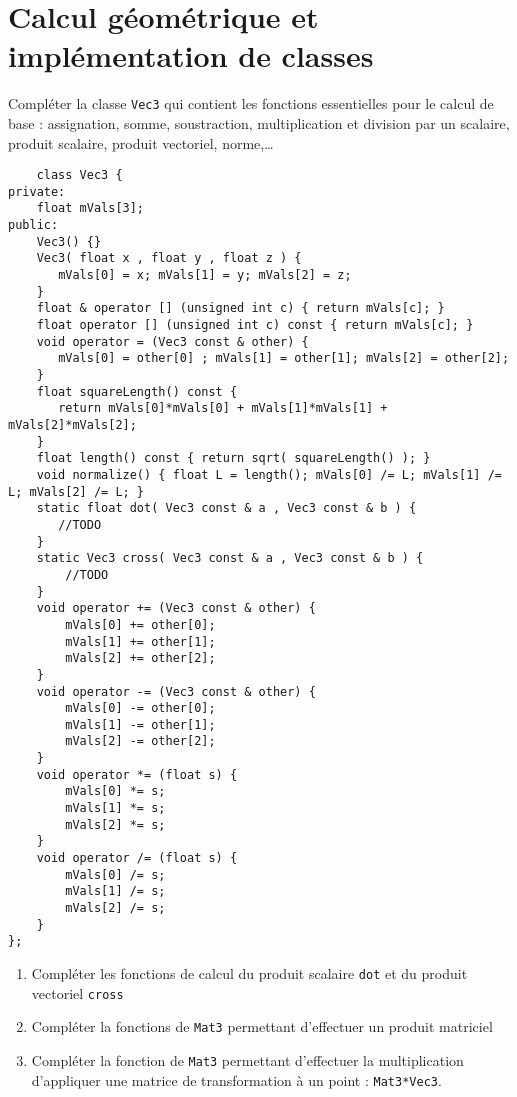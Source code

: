 \documentclass[a4paper,10pt]{tp_um}
\newcommand\code[1]{\texttt{#1}}
\begin{document}
\section{Calcul géométrique et implémentation de classes}

\label{sec_exo_Vec3}

Compléter la classe \code{Vec3} qui contient les fonctions essentielles pour le calcul de base : assignation, somme, soustraction, multiplication et division par un scalaire, produit scalaire, produit vectoriel, norme,\ldots

\begin{verbatim}
    class Vec3 {
private:
    float mVals[3];
public:
    Vec3() {}
    Vec3( float x , float y , float z ) {
       mVals[0] = x; mVals[1] = y; mVals[2] = z;
    }
    float & operator [] (unsigned int c) { return mVals[c]; }
    float operator [] (unsigned int c) const { return mVals[c]; }
    void operator = (Vec3 const & other) {
       mVals[0] = other[0] ; mVals[1] = other[1]; mVals[2] = other[2];
    }
    float squareLength() const {
       return mVals[0]*mVals[0] + mVals[1]*mVals[1] + mVals[2]*mVals[2];
    }
    float length() const { return sqrt( squareLength() ); }
    void normalize() { float L = length(); mVals[0] /= L; mVals[1] /= L; mVals[2] /= L; }
    static float dot( Vec3 const & a , Vec3 const & b ) {
       //TODO
    }
    static Vec3 cross( Vec3 const & a , Vec3 const & b ) {
        //TODO
    }
    void operator += (Vec3 const & other) {
        mVals[0] += other[0];
        mVals[1] += other[1];
        mVals[2] += other[2];
    }
    void operator -= (Vec3 const & other) {
        mVals[0] -= other[0];
        mVals[1] -= other[1];
        mVals[2] -= other[2];
    }
    void operator *= (float s) {
        mVals[0] *= s;
        mVals[1] *= s;
        mVals[2] *= s;
    }
    void operator /= (float s) {
        mVals[0] /= s;
        mVals[1] /= s;
        mVals[2] /= s;
    }
};
\end{verbatim}

\begin{enumerate}
 \item Compléter les fonctions de calcul du produit scalaire \code{dot} et du produit vectoriel \code{cross}
\item Compléter la fonctions de \code{Mat3} permettant d'effectuer un produit matriciel
\item Compléter la fonction de \code{Mat3} permettant d'effectuer la multiplication d'appliquer une matrice de transformation à un point : \code{Mat3*Vec3}.
\end{enumerate}
\end{document}

